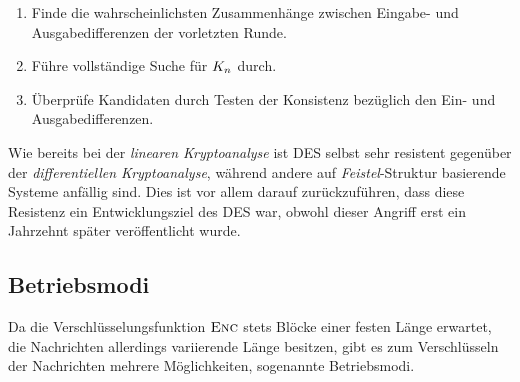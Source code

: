 \begin{enumerate}
	\item Finde die wahrscheinlichsten Zusammenhänge zwischen Eingabe- und Ausgabedifferenzen der vorletzten Runde.
	\item Führe vollständige Suche für $K_n$ durch.
	\item Überprüfe Kandidaten durch Testen der Konsistenz bezüglich den Ein- und Ausgabedifferenzen.
\end{enumerate}

Wie bereits bei der \textit{linearen Kryptoanalyse} ist DES selbst sehr resistent gegenüber der \textit{differentiellen Kryptoanalyse}, während andere auf \textit{Feistel}-Struktur basierende Systeme anfällig sind. Dies ist vor
allem darauf zurückzuführen, dass diese Resistenz ein Entwicklungsziel des DES war, obwohl dieser Angriff erst ein Jahrzehnt später veröffentlicht wurde.

\subsection{Betriebsmodi}
Da die Verschlüsselungsfunktion $\textsc{Enc}$ stets Blöcke einer festen Länge erwartet, die Nachrichten allerdings variierende Länge besitzen, gibt es zum Verschlüsseln der Nachrichten mehrere Möglichkeiten, sogenannte Betriebsmodi.

